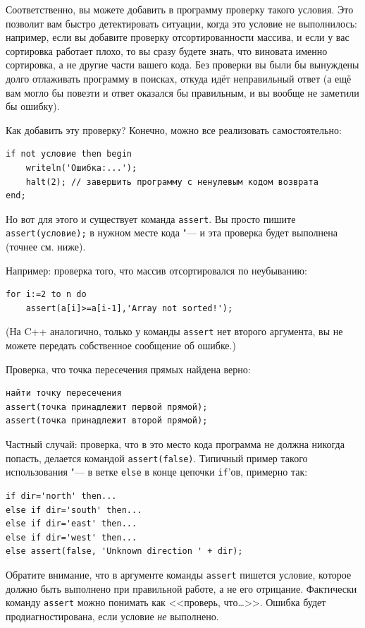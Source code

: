 \documentclass[a4paper,10pt]{problems}
\begin{document}
Соответственно, вы можете добавить в программу проверку такого условия. 
Это позволит вам быстро детектировать ситуации, когда это условие не выполнилось: например, если вы добавите проверку отсортированности массива,
и если у вас сортировка работает плохо, то вы сразу будете знать, что виновата именно сортировка, а не другие части вашего кода.
Без проверки вы были бы вынуждены долго отлаживать программу в поисках, откуда идёт неправильный ответ (а ещё вам могло бы повезти и ответ оказался бы правильным,
и вы вообще не заметили бы ошибку).

Как добавить эту проверку? Конечно, можно все реализовать самостоятельно:
\begin{verbatim}
if not условие then begin 
    writeln('Ошибка:...');
    halt(2); // завершить программу с ненулевым кодом возврата
end;
\end{verbatim}
Но вот для этого и существует команда \verb`assert`. 
Вы просто пишите \verb`assert(условие);` в нужном месте кода "--- и эта проверка будет выполнена (точнее см. ниже).

Например: проверка того, что массив отсортировался по неубыванию:
\begin{verbatim}
for i:=2 to n do
    assert(a[i]>=a[i-1],'Array not sorted!');
\end{verbatim}
(На C++ аналогично, только у команды \verb`assert` нет второго аргумента, вы не можете передать собственное сообщение об ошибке.)

Проверка, что точка пересечения прямых найдена верно:
\begin{verbatim}
найти точку пересечения
assert(точка принадлежит первой прямой);
assert(точка принадлежит второй прямой);
\end{verbatim}

Частный случай: проверка, что в это место кода программа не должна никогда попасть, делается командой \verb`assert(false)`. 
Типичный пример такого использования "--- в ветке \verb`else` в конце цепочки \verb`if`'ов, примерно так:
\begin{verbatim}
if dir='north' then...
else if dir='south' then...
else if dir='east' then...
else if dir='west' then...
else assert(false, 'Unknown direction ' + dir);
\end{verbatim}

Обратите внимание, что в аргументе команды \verb`assert` пишется условие, которое должно быть выполнено при правильной работе, а не его отрицание. 
Фактически команду \verb`assert` можно понимать как <<проверь, что\dots>>. Ошибка будет продиагностирована, если условие \textit{не} выполнено.
\end{document}
